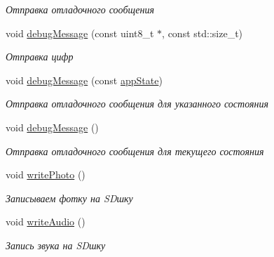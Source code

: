 \begin{DoxyCompactItemize}
\begin{DoxyCompactList}\small\item\em Отправка отладочного сообщения \end{DoxyCompactList}\item 
void \hyperlink{classapp_1_1_t_application_a9f4f8b1ef208edca2c5ea5ef1851efca}{debug\+Message} (const uint8\+\_\+t $\ast$, const std\+::size\+\_\+t)
\begin{DoxyCompactList}\small\item\em Отправка цифр \end{DoxyCompactList}\item 
void \hyperlink{classapp_1_1_t_application_ade46529292a73f5184abb54b135c4a2e}{debug\+Message} (const \hyperlink{group___xD0_x9F_xD0_xB5_xD1_x80_xD0_xB5_xD1_x87_xD0_xB8_xD1_x81_xD0_xBB_xD0_xB5_xD0_xBD_xD0_xB8_xD1_x8F_ga290e8080c661e52c2f685fd4af148acf}{app\+State})
\begin{DoxyCompactList}\small\item\em Отправка отладочного сообщения для указанного состояния \end{DoxyCompactList}\item 
\mbox{\label{classapp_1_1_t_application_a63da2a3bd444ed62efa0e35ae5f0571d}} 
void \hyperlink{classapp_1_1_t_application_a63da2a3bd444ed62efa0e35ae5f0571d}{debug\+Message} ()
\begin{DoxyCompactList}\small\item\em Отправка отладочного сообщения для текущего состояния \end{DoxyCompactList}\item 
\mbox{\label{classapp_1_1_t_application_a2976114a4d6cb5ae83b28459e7a2aa70}} 
void \hyperlink{classapp_1_1_t_application_a2976114a4d6cb5ae83b28459e7a2aa70}{write\+Photo} ()
\begin{DoxyCompactList}\small\item\em Записываем фотку на SD\textquotesingle{}шку \end{DoxyCompactList}\item 
\mbox{\label{classapp_1_1_t_application_ab70622395a7d982ea5f5f53f7cce86c6}} 
void \hyperlink{classapp_1_1_t_application_ab70622395a7d982ea5f5f53f7cce86c6}{write\+Audio} ()
\begin{DoxyCompactList}\small\item\em Запись звука на SD\textquotesingle{}шку \end{DoxyCompactList}\item 

\end{DoxyCompactItemize}

